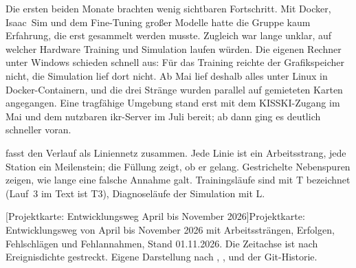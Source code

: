 Die ersten beiden Monate brachten wenig sichtbaren Fortschritt. Mit Docker, Isaac~Sim und dem
Fine-Tuning großer Modelle hatte die Gruppe kaum Erfahrung, die erst gesammelt werden musste.
Zugleich war lange unklar, auf welcher Hardware Training und Simulation laufen würden. Die
eigenen Rechner unter Windows schieden schnell aus: Für das Training reichte der Grafikspeicher
nicht, die Simulation lief dort nicht. Ab Mai lief deshalb alles unter Linux in
Docker-Containern, und die drei Stränge wurden parallel auf gemieteten Karten angegangen. Eine tragfähige
Umgebung stand erst mit dem KISSKI-Zugang im Mai und dem nutzbaren \acs{ikr}-Server im Juli
bereit; ab dann ging es deutlich schneller voran.

 fasst den Verlauf als Liniennetz zusammen. Jede Linie ist ein
Arbeitsstrang, jede Station ein Meilenstein; die Füllung zeigt, ob er gelang. Gestrichelte
Nebenspuren zeigen, wie lange eine falsche Annahme galt. Trainingsläufe sind mit T bezeichnet
(Lauf~3 im Text ist T3), Diagnoseläufe der Simulation mit L.

%
\begin{landscape}
  \thispagestyle{nurseitenzahl}%
  \centering
  [Projektkarte: Entwicklungsweg April bis November 2026]{Projektkarte:
    Entwicklungsweg von April bis November 2026 mit Arbeitssträngen, Erfolgen, Fehlschlägen
    und Fehlannahmen, Stand 01.11.2026. Die Zeitachse ist nach Ereignisdichte gestreckt.
    Eigene Darstellung nach ,
    ,  und der Git-Historie.}%
  \label{fig:projektkarte}
\end{landscape}%
\restoregeometry

